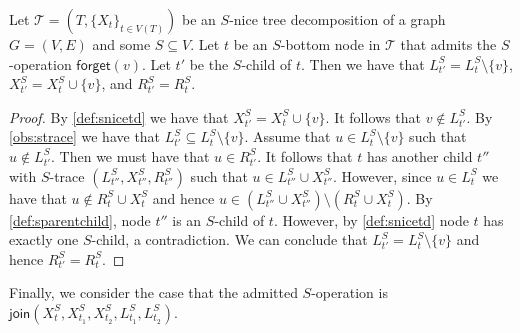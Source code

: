 \documentclass[a4paper,UKenglish,cleveref, autoref, thm-restate, numberwithinsect]{lipics-v2021}
\newcommand{\forget}{\mathsf{forget}}
\newcommand{\join}{\mathsf{join}}
\begin{document}
\begin{observation}\label{obs:forget}
    Let $\mathcal{T}=(T,\{X_t\}_{t\in V(T)})$ be an $S$-nice tree decomposition of a graph $G=(V,E)$ and some $S\subseteq V$. Let $t$ be an $S$-bottom node in $\mathcal{T}$ that admits the $S$-operation $\forget(v)$. Let $t'$ be the $S$-child of $t$.
    Then we have that $L_{t'}^S= L_{t}^S\setminus \{v\}$, $X_{t'}^S= X_{t}^S\cup \{v\}$, and $R_{t'}^S=R_{t}^S$. 
\end{observation}
\begin{proof}
    By \cref{def:snicetd} we have that $X_{t'}^S= X_{t}^S\cup \{v\}$. It follows that $v\notin L_{t'}^S$. By \cref{obs:strace} we have that $L_{t'}^S\subseteq L_{t}^S\setminus\{v\}$.
    Assume that $u\in L_{t}^S\setminus\{v\}$ such that $u\notin L_{t'}^S$. Then we must have that $u\in R_{t'}^S$. It follows that $t$ has another child $t''$ with $S$-trace $(L_{t''}^S, X_{t''}^S, R_{t''}^S)$ such that $u\in L_{t''}^S \cup X_{t''}^S$. However, since $u\in L_{t}^S$ we have that $u\notin R_{t}^S\cup X_{t}^S$ and hence $u\in (L_{t''}^S \cup X_{t''}^S)\setminus (R_{t}^S\cup X_{t}^S)$. By \cref{def:sparentchild}, node $t''$ is an $S$-child of $t$. However, by \cref{def:snicetd} node $t$ has exactly one $S$-child, a contradiction. We can conclude that $L_{t'}^S=L_{t}^S\setminus \{v\}$ and hence $R_{t'}^S=R_{t}^S$. 
\end{proof}
Finally, we consider the case that the admitted $S$-operation is $\join(X^S_t,X_{t_1}^S, X_{t_2}^S,L_{t_1}^S, L_{t_2}^S)$. 
\end{document}
